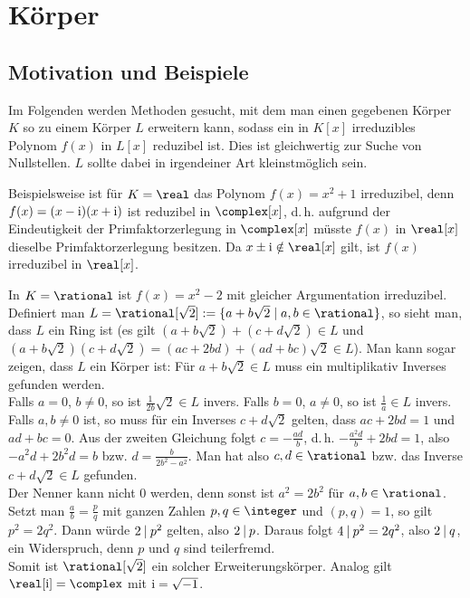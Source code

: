 \section{%
    Körper%
}

\subsection{%
    Motivation und Beispiele%
}

\begin{Bem}
    Im Folgenden werden Methoden gesucht, mit dem man einen gegebenen
    Körper $K$ so zu einem Körper $L$ erweitern kann,
    sodass ein in $K[x]$ irreduzibles Polynom $f(x)$ in $L[x]$ reduzibel ist.
    Dies ist gleichwertig zur Suche von Nullstellen.
    $L$ sollte dabei in irgendeiner Art kleinstmöglich sein.
\end{Bem}

\begin{Bsp}
    Beispielsweise ist für $K = \real$ das Polynom $f(x) = x^2 + 1$
    irreduzibel, denn\\
    $f(x) = (x - \text{i})(x + \text{i})$ ist reduzibel in $\complex[x]$,
    d.\,h. aufgrund der Eindeutigkeit der Primfaktorzerlegung in $\complex[x]$
    müsste $f(x)$ in $\real[x]$ dieselbe Primfaktorzerlegung besitzen.
    Da $x \pm \i \notin \real[x]$ gilt, ist $f(x)$ irreduzibel in $\real[x]$.
\end{Bsp}

\begin{Bsp}
    In $K = \rational$ ist $f(x) = x^2 - 2$ mit gleicher Argumentation
    irreduzibel.
    Definiert man $L = \rational[\sqrt{2}] :=
    \{a + b\sqrt{2} \;|\; a, b \in \rational\}$, so sieht man, dass $L$
    ein Ring ist
    (es gilt $(a + b\sqrt{2}) + (c + d\sqrt{2}) \in L$ und
    $(a + b\sqrt{2})(c + d\sqrt{2}) = (ac + 2bd) + (ad + bc)\sqrt{2} \in L$).
    Man kann sogar zeigen, dass $L$ ein Körper ist:
    Für $a + b\sqrt{2} \in L$ muss ein multiplikativ
    Inverses gefunden werden.\\
    Falls $a = 0$, $b \not= 0$, so ist $\frac{1}{2b} \sqrt{2} \in L$ invers.
    Falls $b = 0$, $a \not= 0$, so ist $\frac{1}{a} \in L$ invers.\\
    Falls $a, b \not= 0$ ist, so muss für ein Inverses $c + d\sqrt{2}$ gelten,
    dass $ac + 2bd = 1$ und $ad + bc = 0$.
    Aus der zweiten Gleichung folgt $c = -\frac{ad}{b}$, d.\,h.
    $-\frac{a^2 d}{b} + 2bd = 1$, also
    $-a^2 d + 2b^2 d = b$ bzw.
    $d = \frac{b}{2b^2 - a^2}$.
    Man hat also $c, d \in \rational$ bzw. das Inverse $c + d\sqrt{2} \in L$
    gefunden.\\
    Der Nenner kann nicht $0$ werden, denn sonst ist
    $a^2 = 2b^2$ für $a, b \in \rational$.
    Setzt man $\frac{a}{b} = \frac{p}{q}$ mit ganzen Zahlen $p, q \in \integer$
    und $(p, q) = 1$, so gilt $p^2 = 2q^2$.
    Dann würde $2 \mathbin{|} p^2$ gelten, also $2 \mathbin{|} p$.
    Daraus folgt $4 \mathbin{|} p^2 = 2q^2$, also $2 \mathbin{|} q$,
    ein Widerspruch, denn $p$ und $q$ sind teilerfremd.\\
    Somit ist $\rational[\sqrt{2}]$ ein solcher Erweiterungskörper.
    Analog gilt $\real[\i] = \complex$ mit $\text{i} = \sqrt{-1}$.
\end{Bsp}

